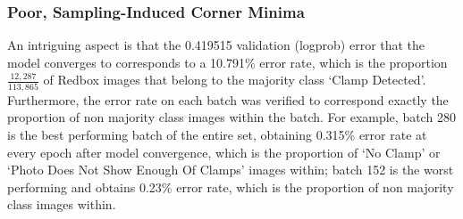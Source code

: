 \documentclass[a4paper,11pt]{article}
\begin{document}
%
%
%
%
%
%



\subsubsection{Poor, Sampling-Induced Corner Minima}

An intriguing aspect is that the 0.419515 validation (logprob) error that the model converges to corresponds to a 10.791\%  error rate, which is the proportion $\frac{12,287}{113,865}$ of Redbox images that belong to the majority class `Clamp Detected'. Furthermore, the error rate on each batch was verified to correspond exactly the proportion of non majority class images within the batch. For example, batch 280 is the best performing batch of the entire set, obtaining 0.315\% error rate at every epoch after model convergence, which is the proportion of `No Clamp' or `Photo Does Not Show Enough Of Clamps' images within; batch 152 is the worst performing and obtains 0.23\% error rate, which is the proportion of non majority class images within. 
\end{document}
